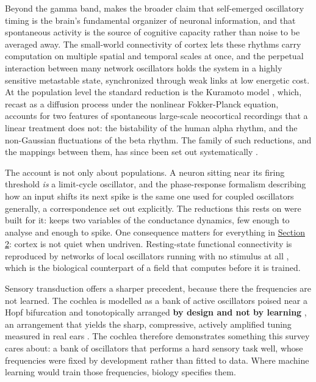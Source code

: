 \documentclass[10pt]{article}
\begin{document}
Beyond the gamma band, \citet{buzsaki2006} makes the broader claim that
self-emerged oscillatory timing is the brain's fundamental organizer of
neuronal information, and that spontaneous activity is the source of
cognitive capacity rather than noise to be averaged away. The
small-world connectivity of cortex lets these rhythms carry computation
on multiple spatial and temporal scales at once, and the perpetual
interaction between many network oscillators holds the system in a
highly sensitive metastable state, synchronized through weak links at
low energetic cost. At the population level the standard reduction is
the Kuramoto model \citep{breakspear2010}, which, recast as a diffusion
process under the nonlinear Fokker-Planck equation, accounts for two
features of spontaneous large-scale neocortical recordings that a linear
treatment does not: the bistability of the human alpha rhythm, and the
non-Gaussian fluctuations of the beta rhythm. The family of such
reductions, and the mappings between them, has since been set out
systematically \citep{castaldo2026}.

The account is not only about populations. A neuron sitting near its
firing threshold \emph{is} a limit-cycle oscillator, and the
phase-response formalism describing how an input shifts its next spike
is the same one used for coupled oscillators generally, a correspondence
\citet{stiefel2016} set out explicitly. The reductions this rests on
were built for it: \citet{morris1981} keeps two variables of the
\citet{hodgkin1952} conductance dynamics, few enough to analyse and
enough to spike. One consequence matters for everything in
\hyperref[sec-2]{Section 2}: cortex is not quiet when undriven.
Resting-state functional connectivity is reproduced by networks of local
oscillators running with no stimulus at all \citep{cabral2011}, which is
the biological counterpart of a field that computes before it is
trained.

Sensory transduction offers a sharper precedent, because there the
frequencies are not learned. The cochlea is modelled as a bank of active
oscillators poised near a Hopf bifurcation and tonotopically arranged
\textbf{by design and not by learning} \citep{camalet2000}, an
arrangement that yields the sharp, compressive, actively amplified
tuning measured in real ears \citep{kern2003}. The cochlea therefore
demonstrates something this survey cares about: a bank of oscillators
that performs a hard sensory task well, whose frequencies were fixed by
development rather than fitted to data. Where machine learning would
train those frequencies, biology specifies them.
\end{document}
